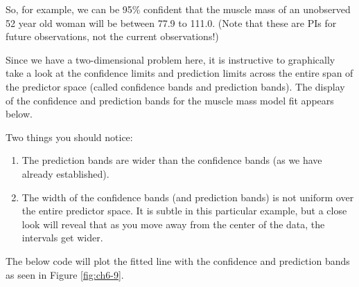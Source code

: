 \documentclass[
]{book}
\providecommand{\tightlist}{%
  \setlength{\itemsep}{0pt}\setlength{\parskip}{0pt}}
\begin{document}
So, for example, we can be 95\% confident that the muscle mass of an unobserved 52 year old woman will be between 77.9 to 111.0.
(Note that these are PIs for future observations, not the current observations!)

Since we have a two-dimensional problem here, it is instructive to graphically take a look at the confidence limits and prediction limits across the entire span of the predictor space (called confidence bands and prediction bands).
The display of the confidence and prediction bands for the muscle mass model fit appears below.

Two things you should notice:

\begin{enumerate}
\def\labelenumi{\arabic{enumi}.}
\tightlist
\item
  The prediction bands are wider than the confidence bands (as we have already established).
\item
  The width of the confidence bands (and prediction bands) is not uniform over the entire predictor space. It is subtle in this particular example, but a close look will reveal that as you move away from the center of the data, the intervals get wider.
\end{enumerate}

The below code will plot the fitted line with the confidence and prediction bands as seen in Figure \ref{fig:ch6-9}.
\end{document}
